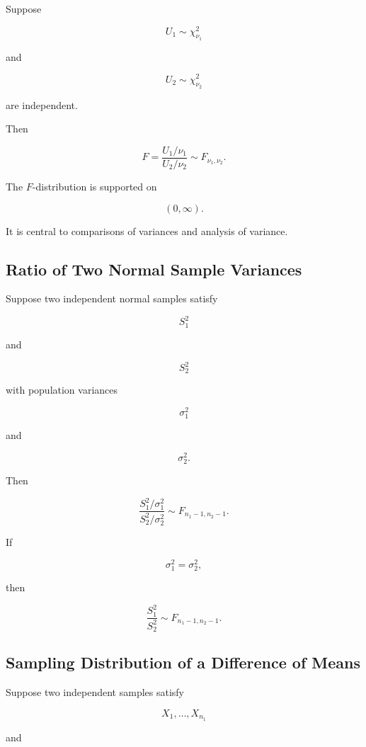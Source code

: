 Suppose

\[
U_1\sim\chi^2_{\nu_1}
\]

and

\[
U_2\sim\chi^2_{\nu_2}
\]

are independent.

Then

\[
\boxed{
F
=
\frac{
U_1/\nu_1
}{
U_2/\nu_2
}
\sim
F_{\nu_1,\nu_2}.
}
\]

The \(F\)-distribution is supported on

\[
(0,\infty).
\]

It is central to comparisons of variances and analysis of variance.

\subsection{Ratio of Two Normal Sample Variances}
\label{subsec:ratio-sample-variances}

Suppose two independent normal samples satisfy

\[
S_1^2
\]

and

\[
S_2^2
\]

with population variances

\[
\sigma_1^2
\]

and

\[
\sigma_2^2.
\]

Then

\[
\boxed{
\frac{
S_1^2/\sigma_1^2
}{
S_2^2/\sigma_2^2
}
\sim
F_{n_1-1,n_2-1}.
}
\]

If

\[
\sigma_1^2=\sigma_2^2,
\]

then

\[
\boxed{
\frac{
S_1^2
}{
S_2^2
}
\sim
F_{n_1-1,n_2-1}.
}
\]

\subsection{Sampling Distribution of a Difference of Means}
\label{subsec:difference-two-means-sampling}

Suppose two independent samples satisfy

\[
X_1,\ldots,X_{n_1}
\]

and

